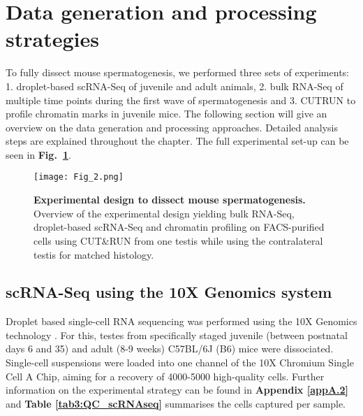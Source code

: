 
\section{Data generation and processing strategies}

To fully dissect mouse spermatogenesis, we performed three sets of experiments: 1. droplet-based scRNA-Seq of juvenile and adult animals, 2. bulk RNA-Seq of multiple time points during the first wave of spermatogenesis and 3. \gls{CUTRUN} to profile chromatin marks in juvenile mice. The following section will give an overview on the data generation and processing approaches. Detailed analysis steps are explained throughout the chapter. The full experimental set-up can be seen in \textbf{Fig.~\ref{fig3:experimental_design}}.

\begin{figure}[!h]
\centering
\texttt{[image: Fig\_2.png]}
\caption[Experimental design to dissect mouse spermatogenesis]{\textbf{Experimental design to dissect mouse spermatogenesis.}\\
Overview of the experimental design yielding bulk RNA-Seq, droplet-based scRNA-Seq and chromatin profiling on FACS-purified cells using CUT\&{}RUN from one testis while using the contralateral testis for matched histology.}
\label{fig3:experimental_design}
\end{figure}

\subsection{scRNA-Seq using the 10X Genomics\texttrademark{} system}

Droplet based single-cell RNA sequencing was performed using the 10X Genomics\texttrademark{} technology \citep{Zheng2017}. For this, testes from specifically staged juvenile (between postnatal days 6 and 35) and adult (8-9 weeks) C57BL/6J (B6) mice were dissociated. Single-cell suspensions were loaded into one channel of the 10X Chromium\texttrademark{} Single Cell A Chip, aiming for a recovery of 4000-5000 high-quality cells. Further information on the experimental strategy can be found in \textbf{Appendix \ref{appA.2}} and \textbf{Table \ref{tab3:QC_scRNAseq}} summarises the cells captured per sample.

\newpage

